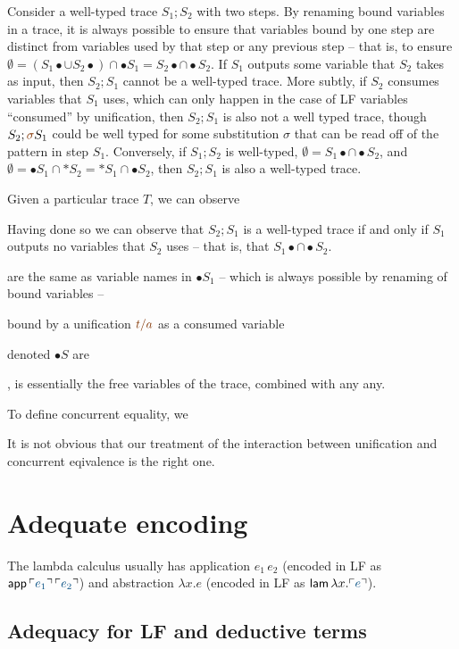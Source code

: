Consider a well-typed trace $S_1; S_2$ with two steps.  By renaming
bound variables in a trace, it is always possible to ensure that
variables bound by one step are distinct from variables used by that
step or any previous step -- that is, to ensure $\emptyset =
(S_1{\bullet} \cup S_2{\bullet}) \cap {\bullet}S_1 = {S_2}{\bullet}
\cap {\bullet}S_2$. If $S_1$ outputs some variable that $S_2$ takes as
input, then $S_2; S_1$ cannot be a well-typed trace. More subtly, if
$S_2$ consumes variables that $S_1$ uses, which can only happen in the
case of LF variables ``consumed'' by unification, then $S_2; S_1$ is
also not a well typed trace, though $S_2; \lf{\sigma}S_1$ could be
well typed for some substitution $\sigma$ that can be read off of the
pattern in step $S_1$. Conversely, if $S_1; S_2$ is well-typed,
$\emptyset = S_1{\bullet} \cap {\bullet}S_2$, and $\emptyset =
{\bullet}S_1 \cap {\ast}S_2 = {\ast}S_1 \cap {\bullet}S_2$, then $S_2;
S_1$ is also a well-typed trace.

Given a particular trace $T$, we can observe 

Having done so we can observe that $S_2; S_1$ is a
well-typed trace if and only if $S_1$ outputs no variables
that $S_2$ uses -- that is, that $S_1{\bullet} \cap {\bullet}S_2$.

are the same as variable
names in ${\bullet}S_1$ -- which is always possible by renaming of
bound variables --

bound by
a unification $\lf{t/a}$ as a consumed variable


 denoted ${\bullet}S$
are 

, is 
essentially the free variables of the trace, combined with any any. 


To define concurrent equality, we 

It is not obvious that our treatment of the interaction between 
unification and concurrent eqivalence is the right one. 

\section{Adequate encoding}

The lambda
calculus usually has application $e_1\,e_2$ (encoded in LF as ${\sf
  app}\,\interp{e_1}\,\interp{e_2}$) and abstraction $\lambda x.e$
(encoded in LF as ${\sf lam}\,\lambda x. \interp{e}$). 

\subsection{Adequacy for LF and deductive terms}

